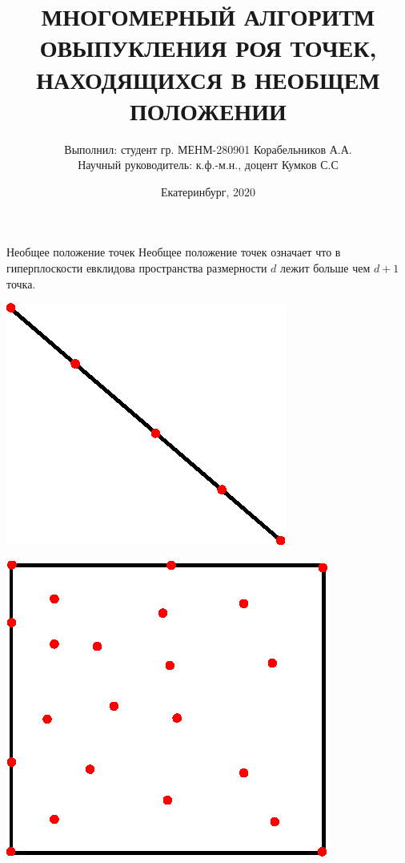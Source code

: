 \documentclass[]{beamer} %
\begin{document}
\title{МНОГОМЕРНЫЙ АЛГОРИТМ ОВЫПУКЛЕНИЯ РОЯ ТОЧЕК, НАХОДЯЩИХСЯ В НЕОБЩЕМ ПОЛОЖЕНИИ}
\author[Корабельников А.А.]{\scriptsize Выполнил: студент гр. МЕНМ-280901 Корабельников А.А.\\Научный руководитель: к.ф.-м.н., доцент Кумков С.С}
\date{Екатеринбург, 2020}
\frame{\titlepage}
\begin{frame}{Необщее положение точек}
   Необщее положение точек означает что в гиперплоскости евклидова пространства размерности $d$ лежит больше чем $d +1$ точка.\\
   \vfill
    \begin{minipage}{.49\textwidth}
    \centering
    \includegraphics[width=0.5\linewidth]{line.eps}
  \end{minipage}
  \begin{minipage}{.49\textwidth}
    \centering
    \includegraphics[width=0.5\linewidth]{cube1.eps}
  \end{minipage}
\end{frame}
\end{document}
